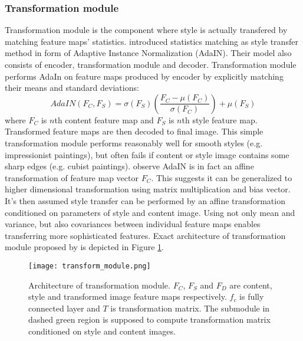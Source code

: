 \documentclass[../Main.tex]{subfiles}
\begin{document}
    \subsubsection{Transformation module}
    Transformation module is the component where style is actually transfered
    by matching feature maps' statistics. \cite{huang2017adain} introduced
    statistics matching as style transfer method in form of Adaptive Instance
    Normalization (AdaIN). Their model also consists of encoder, transformation
    module and decoder. Transformation module performs AdaIn on feature maps
    produced by encoder by explicitly matching their means and standard deviations:
    \[ AdaIN(F_C, F_S) = \sigma(F_S)\left( \frac{F_C - \mu(F_C)}{\sigma(F_C)}\right)+\mu(F_S) \]
    where $F_C$ is $n$th content feature map and $F_S$ is $n$th style feature map.
    Transformed feature maps are then decoded to final image. This simple transformation 
    module performs reasonably well for smooth styles (e.g. impressionist paintings),
    but often fails if content or style image contains some sharp edges 
    (e.g. cubist paintings). \cite{Li2018} observe
    AdaIN is in fact an affine transformation of feature map vector $F_C$. 
    This suggests it can be generalized to higher dimensional transformation 
    using matrix multiplication and bias vector. It's then assumed style transfer
    can be performed by an affine transformation conditioned on parameters 
    of style and content image. Using not only mean and variance, but also 
    covariances between individual feature maps enables transferring 
    more sophisticated features. Exact architecture of
    transformation module proposed by \cite{Li2018} is depicted in Figure
    \ref{fig:transform_module}. 
    
        \begin{figure}[h!]
        \centering
            \texttt{[image: transform\_module.png]}
            \caption{Architecture of transformation module. $F_C$, $F_S$ and $F_D$
            are content, style and transformed image feature maps respectively.
            $f_c$ is fully connected layer and $T$ is transformation matrix. 
            The submodule in dashed green region is supposed to compute 
            transformation matrix conditioned on style and content images.
            }
            \label{fig:transform_module}
        \end{figure}
        
\end{document}

